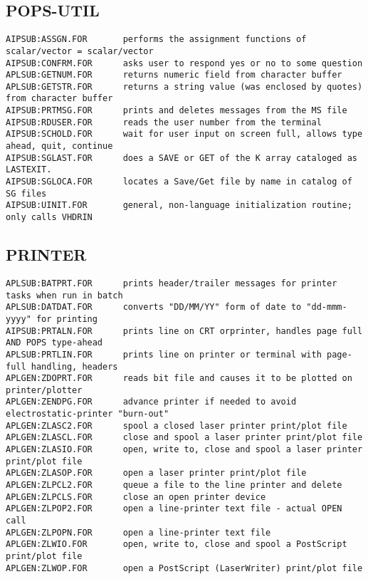 \subsection{POPS-UTIL}
\begin{verbatim}
AIPSUB:ASSGN.FOR       performs the assignment functions of scalar/vector = scalar/vector
AIPSUB:CONFRM.FOR      asks user to respond yes or no to some question
APLSUB:GETNUM.FOR      returns numeric field from character buffer
APLSUB:GETSTR.FOR      returns a string value (was enclosed by quotes) from character buffer
AIPSUB:PRTMSG.FOR      prints and deletes messages from the MS file
AIPSUB:RDUSER.FOR      reads the user number from the terminal
AIPSUB:SCHOLD.FOR      wait for user input on screen full, allows type ahead, quit, continue
AIPSUB:SGLAST.FOR      does a SAVE or GET of the K array cataloged as LASTEXIT.
AIPSUB:SGLOCA.FOR      locates a Save/Get file by name in catalog of SG files
AIPSUB:UINIT.FOR       general, non-language initialization routine; only calls VHDRIN
\end{verbatim}
 
\subsection{PRINTER}
\begin{verbatim}
APLSUB:BATPRT.FOR      prints header/trailer messages for printer tasks when run in batch
APLSUB:DATDAT.FOR      converts "DD/MM/YY" form of date to "dd-mmm-yyyy" for printing
AIPSUB:PRTALN.FOR      prints line on CRT orprinter, handles page full AND POPS type-ahead
APLSUB:PRTLIN.FOR      prints line on printer or terminal with page-full handling, headers
APLGEN:ZDOPRT.FOR      reads bit file and causes it to be plotted on printer/plotter
APLGEN:ZENDPG.FOR      advance printer if needed to avoid electrostatic-printer "burn-out"
APLGEN:ZLASC2.FOR      spool a closed laser printer print/plot file
APLGEN:ZLASCL.FOR      close and spool a laser printer print/plot file
APLGEN:ZLASIO.FOR      open, write to, close and spool a laser printer print/plot file
APLGEN:ZLASOP.FOR      open a laser printer print/plot file
APLGEN:ZLPCL2.FOR      queue a file to the line printer and delete
APLGEN:ZLPCLS.FOR      close an open printer device
APLGEN:ZLPOP2.FOR      open a line-printer text file - actual OPEN call
APLGEN:ZLPOPN.FOR      open a line-printer text file
APLGEN:ZLWIO.FOR       open, write to, close and spool a PostScript print/plot file
APLGEN:ZLWOP.FOR       open a PostScript (LaserWriter) print/plot file
\end{verbatim}
 
